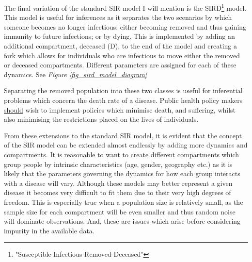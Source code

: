 \documentclass[11pt,a4paper]{article}
\theoremstyle{break}
\begin{document}

  \par The final variation of the standard SIR model I will mention is the SIRD\footnote{"Susceptible-Infectious-Removed-Deceased"} model. This model is useful for inferences as it separates the two scenarios by which someone becomes no longer infectious: either becoming removed and thus gaining immunity to future infections; or by dying. This is implemented by adding an additional compartment, deceased (D), to the end of the model and creating a fork which allows for individuals who are infectious to move either the removed or deceased compartments. Different parameters are assigned for each of these dynamics. See \textit{Figure \ref{fig_sird_model_diagram}}

  \par Separating the removed population into these two classes is useful for inferential problems which concern the death rate of a disease. Public health policy makers \underline{should} wish to implement policies which minimise death, and suffering, whilst also minimising the restrictions placed on the lives of individuals.

  \par From these extensions to the standard SIR model, it is evident that the concept of the SIR model can be extended almost endlessly by adding more dynamics and compartments. It is reasonable to want to create different compartments which group people by intrinsic characteristics (age, gender, geography etc.) as it is likely that the parameters governing the dynamics for how each group interacts with a disease will vary. Although these models may better represent a given disease it becomes very difficult to fit them due to their very high degrees of freedom. This is especially true when a population size is relatively small, as the sample size for each compartment will be even smaller and thus random noise will dominate observations. And, these are issues which arise before considering impurity in the available data.
\end{document}
